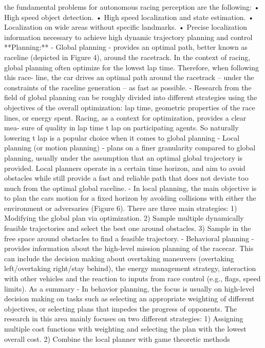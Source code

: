 the fundamental problems for autonomous racing perception are the following: 
	• High speed object detection. 
	• High speed localization and state estimation. 
	• Localization on wide areas without specific landmarks. 
	• Precise localization information necessary to achieve high dynamic trajectory planning and control
**Planning:** 
	- Global planning 
		- provides an optimal path, better known as raceline (depicted in Figure 4), around the racetrack. In the context of racing, global planning often optimize for the lowest lap time. Therefore, when following this race- line, the car drives an optimal path around the racetrack – under the constraints of the raceline generation – as fast as possible.
		- Research from the field of global planning can be roughly divided into different strategies using the objectives of the overall optimization: lap time, geometric properties of the race lines, or energy spent. Racing, as a context for optimization, provides a clear mea- sure of quality in lap time t lap on participating agents. So naturally lowering t lap is a popular choice when it comes to global planning
	- Local planning (or motion planning) 
		- plans on a finer granularity compared to global planning, usually under the assumption that an optimal global trajectory is provided. Local planners operate in a certain time horizon, and aim to avoid obstacles while still provide a fast and reliable path that does not deviate too much from the optimal global raceline.
		- In local planning, the main objective is to plan the cars motion for a fixed horizon by avoiding collisions with either the environment or adversaries (Figure 6). There are three main strategies: 
			1) Modifying the global plan via optimization. 
			2) Sample multiple dynamically feasible trajectories and select the best one around obstacles. 
			3) Sample in the free space around obstacles to find a feasible trajectory.
	- Behavioral planning 
		- provides information about the high-level mission planning of the racecar. This can include the decision making about overtaking maneuvers (overtaking left/overtaking right/stay behind), the energy management strategy, interaction with other vehicles and the reaction to inputs from race control (e.g., flags, speed limits). As a summary
		- In behavior planning, the focus is usually on high-level decision making on tasks such as selecting an appropriate weighting of different objectives, or selecting plans that impedes the progress of opponents. The research in this area mainly focuses on two different strategies: 
			1) Assigning multiple cost functions with weighting and selecting the plan with the lowest overall cost. 
			2) Combine the local planner with game theoretic methods

